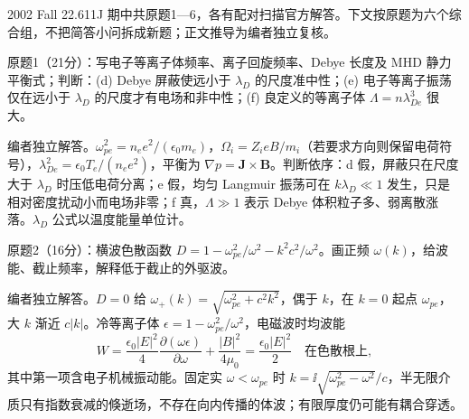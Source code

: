 2002 Fall 22.611J 期中共原题1—6，各有配对扫描官方解答。下文按原题为六个综合组，不把简答小问拆成新题；正文推导为编者独立复核。
\begin{exercise}\label{ex:hist02-mid-1}
原题1（21分）：写电子等离子体频率、离子回旋频率、Debye 长度及 MHD 静力平衡式；判断：(d) Debye 屏蔽使远小于 $\lambda_D$ 的尺度准中性；(e) 电子等离子振荡仅在远小于 $\lambda_D$ 的尺度才有电场和非中性；(f) 良定义的等离子体 $\Lambda=n\lambda_{De}^3$ 很大。
\end{exercise}
\begin{solution}
编者独立解答。$\omega_{pe}^2=n_ee^2/(\epsilon_0m_e)$，$\Omega_i=Z_ieB/m_i$（若要求方向则保留电荷符号），$\lambda_{De}^2=\epsilon_0T_e/(n_ee^2)$，平衡为 $\nabla p=\mathbf J\times\mathbf B$。判断依序：d 假，屏蔽只在尺度大于 $\lambda_D$ 时压低电荷分离；e 假，均匀 Langmuir 振荡可在 $k\lambda_D\ll1$ 发生，只是相对密度扰动小而电场非零；f 真，$\Lambda\gg1$ 表示 Debye 体积粒子多、弱离散涨落。$\lambda_D$ 公式以温度能量单位计。
\end{solution}

\begin{exercise}\label{ex:hist02-mid-2}
原题2（16分）：横波色散函数 $D=1-\omega_{pe}^2/\omega^2-k^2c^2/\omega^2$。画正频 $\omega(k)$，给波能、截止频率，解释低于截止的外驱波。
\end{exercise}
\begin{solution}
编者独立解答。$D=0$ 给 $\omega_+(k)=\sqrt{\omega_{pe}^2+c^2k^2}$，偶于 $k$，在 $k=0$ 起点 $\omega_{pe}$，大 $k$ 渐近 $c|k|$。冷等离子体 $\epsilon=1-\omega_{pe}^2/\omega^2$，电磁波时均波能
\begin{equation}W=\frac{\epsilon_0|E|^2}{4}\frac{\partial(\omega\epsilon)}{\partial\omega}+\frac{|B|^2}{4\mu_0}=\frac{\epsilon_0|E|^2}{2}\quad\text{在色散根上},\end{equation}
其中第一项含电子机械振动能。固定实 $\omega<\omega_{pe}$ 时 $k=\ii\sqrt{\omega_{pe}^2-\omega^2}/c$，半无限介质只有指数衰减的倏逝场，不存在向内传播的体波；有限厚度仍可能有耦合穿透。
\end{solution}

